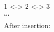 \documentclass[preview]{standalone}
\begin{document}
1 <-> 2 <-> 3\\```\\After insertion:\\
\end{document}
